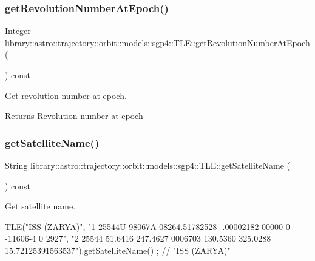 \subsubsection{\texorpdfstring{get\+Revolution\+Number\+At\+Epoch()}{getRevolutionNumberAtEpoch()}}
{\footnotesize\ttfamily Integer library\+::astro\+::trajectory\+::orbit\+::models\+::sgp4\+::\+T\+L\+E\+::get\+Revolution\+Number\+At\+Epoch (\begin{DoxyParamCaption}{ }\end{DoxyParamCaption}) const}



Get revolution number at epoch. 

\begin{DoxyReturn}{Returns}
Revolution number at epoch 
\end{DoxyReturn}
\mbox{\label{classlibrary_1_1astro_1_1trajectory_1_1orbit_1_1models_1_1sgp4_1_1_t_l_e_a95bb43f9fcf34aee66da615eee909c58}} 
\subsubsection{\texorpdfstring{get\+Satellite\+Name()}{getSatelliteName()}}
{\footnotesize\ttfamily String library\+::astro\+::trajectory\+::orbit\+::models\+::sgp4\+::\+T\+L\+E\+::get\+Satellite\+Name (\begin{DoxyParamCaption}{ }\end{DoxyParamCaption}) const}



Get satellite name. 


\begin{DoxyCode}
\hyperlink{classlibrary_1_1astro_1_1trajectory_1_1orbit_1_1models_1_1sgp4_1_1_t_l_e_a4d2b43f02cef44f0c9635daf9946261c}{TLE}(\textcolor{stringliteral}{"ISS (ZARYA)"},
    \textcolor{stringliteral}{"1 25544U 98067A   08264.51782528 -.00002182  00000-0 -11606-4 0  2927"},
    \textcolor{stringliteral}{"2 25544  51.6416 247.4627 0006703 130.5360 325.0288 15.72125391563537"}).getSatelliteName() ; \textcolor{comment}{// "ISS
       (ZARYA)"}
\end{DoxyCode}


